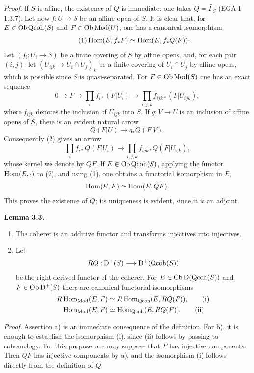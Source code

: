 \documentclass[11pt]{article}
\begin{document}
\emph{Proof.} If $S$ is affine, the existence of $Q$ is immediate: one takes $Q=\widetilde{\Gamma_S}$ (EGA I 1.3.7). Let now $f:U\to S$ be an affine open of $S$. It is clear that, for $E\in\operatorname{Ob}\operatorname{Qcoh}(S)$ and $F\in\operatorname{Ob}\operatorname{Mod}(U)$, one has a canonical isomorphism
\begin{equation}\tag{1}
 \operatorname{Hom}(E,f_*F)\simeq \operatorname{Hom}(E,f_*Q(F)).
\end{equation}
Let $(f_i:U_i\to S)$ be a finite covering of $S$ by affine opens, and, for each pair $(i,j)$, let $(U_{ijk}\to U_i\cap U_j)_k$ be a finite covering of $U_i\cap U_j$ by affine opens, which is possible since $S$ is quasi-separated. For $F\in\operatorname{Ob}\operatorname{Mod}(S)$ one has an exact sequence
\begin{equation}\tag{2}
 0\longrightarrow F\longrightarrow \prod_i f_{i*}(F|U_i)
 \longrightarrow \prod_{i,j,k}f_{ijk*}(F|U_{ijk}),
\end{equation}
where $f_{ijk}$ denotes the inclusion of $U_{ijk}$ into $S$. If $g:V\to U$ is an inclusion of affine opens of $S$, there is an evident natural arrow
\[
 Q(F|U)\longrightarrow g_*Q(F|V).
\]
Consequently (2) gives an arrow
\begin{equation}\tag{3}
 \prod_i f_{i*}Q(F|U_i)\longrightarrow
 \prod_{i,j,k}f_{ijk*}Q(F|U_{ijk}),
\end{equation}
whose kernel we denote by $QF$. If $E\in\operatorname{Ob}\operatorname{Qcoh}(S)$, applying the functor $\operatorname{Hom}(E,\cdot)$ to (2), and using (1), one obtains a functorial isomorphism in $E$,
\[
 \operatorname{Hom}(E,F)\simeq\operatorname{Hom}(E,QF).
\]
This proves the existence of $Q$; its uniqueness is evident, since it is an adjoint.

\textbf{Lemma 3.3.} \begin{enumerate}[label=\alph*)]
\item The coherer is an additive functor and transforms injectives into injectives.
\item Let
\[
 RQ:\mathrm D^+(S)\longrightarrow \mathrm D^+(\operatorname{Qcoh}(S))
\]
be the right derived functor of the coherer. For $E\in\operatorname{Ob}\mathrm D(\operatorname{Qcoh}(S))$ and $F\in\operatorname{Ob}\mathrm D^+(S)$ there are canonical functorial isomorphisms
\begin{align}
 R\operatorname{Hom}_{\operatorname{Mod}}(E,F)&\simeq R\operatorname{Hom}_{\operatorname{Qcoh}}(E,RQ(F)), \tag{i}\\
 \operatorname{Hom}_{\operatorname{Mod}}(E,F)&\simeq \operatorname{Hom}_{\operatorname{Qcoh}}(E,RQ(F)). \tag{ii}
\end{align}
\end{enumerate}

\emph{Proof.} Assertion a) is an immediate consequence of the definition. For b), it is enough to establish the isomorphism (i), since (ii) follows by passing to cohomology. For this purpose one may suppose that $F$ has injective components. Then $QF$ has injective components by a), and the isomorphism (i) follows directly from the definition of $Q$.
\end{document}
